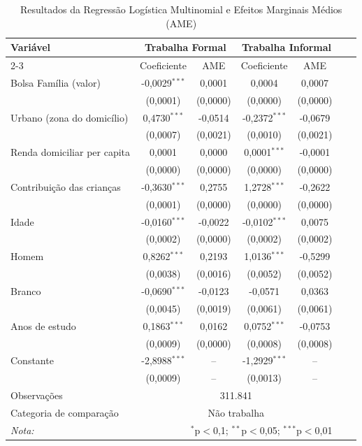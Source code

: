 \documentclass[12pt]{article}
\theoremstyle{break}
\begin{document}
\begin{table}[H] 
\centering 
\renewcommand{\arraystretch}{1.5}
  \caption{Resultados da Regressão Logística Multinomial e Efeitos Marginais Médios (AME)} 
  \label{tab:logit_multinomial} 
\begin{tabular}{lcccccc} 
\hline 
\hline 
Variável & \multicolumn{2}{c}{\textbf{Trabalha Formal}} & \multicolumn{2}{c}{\textbf{Trabalha Informal}} \\ 
\cline{2-3} \cline{4-5} 
         & Coeficiente & AME & Coeficiente & AME \\ 
\hline 
Bolsa Família (valor) & -0,0029$^{***}$ & 0,0001 & 0,0004 & 0,0007 \\ 
                       & (0,0001) & (0,0000) & (0,0000) & (0,0000) \\ 
Urbano (zona do domicílio) & 0,4730$^{***}$ & -0,0514 & -0,2372$^{***}$ & -0,0679 \\ 
                       & (0,0007) & (0,0021) & (0,0010) & (0,0021) \\ 
Renda domiciliar per capita & 0,0001 & 0,0000 & 0,0001$^{***}$ & -0,0001 \\ 
                            & (0,0000) & (0,0000) & (0,0000) & (0,0000) \\ 
Contribuição das crianças & -0,3630$^{***}$ & 0,2755 & 1,2728$^{***}$ & -0,2622 \\ 
                           & (0,0001) & (0,0000) & (0,0000) & (0,0000) \\ 
Idade & -0,0160$^{***}$ & -0,0022 & -0,0102$^{***}$ & 0,0075 \\ 
      & (0,0002) & (0,0000) & (0,0002) & (0,0002) \\ 
Homem & 0,8262$^{***}$ & 0,2193 & 1,0136$^{***}$ & -0,5299 \\ 
      & (0,0038) & (0,0016) & (0,0052) & (0,0052) \\ 
Branco & -0,0690$^{***}$ & -0,0123 & -0,0571 & 0,0363 \\ 
       & (0,0045) & (0,0019) & (0,0061) & (0,0061) \\ 
Anos de estudo & 0,1863$^{***}$ & 0,0162 & 0,0752$^{***}$ & -0,0753 \\ 
               & (0,0009) & (0,0000) & (0,0008) & (0,0008) \\ 
Constante & -2,8988$^{***}$ & -- & -1,2929$^{***}$ & -- \\ 
          & (0,0009) & -- & (0,0013) & -- \\ 
\hline 
Observações & \multicolumn{4}{c}{311.841} \\ 
Categoria de comparação &  \multicolumn{4}{c}{Não trabalha} \\
\hline 
\hline 
\textit{Nota:} & \multicolumn{4}{r}{$^{*}$p$<$0,1; $^{**}$p$<$0,05; $^{***}$p$<$0,01} \\ 
\end{tabular} 
\end{table}
\end{document}
